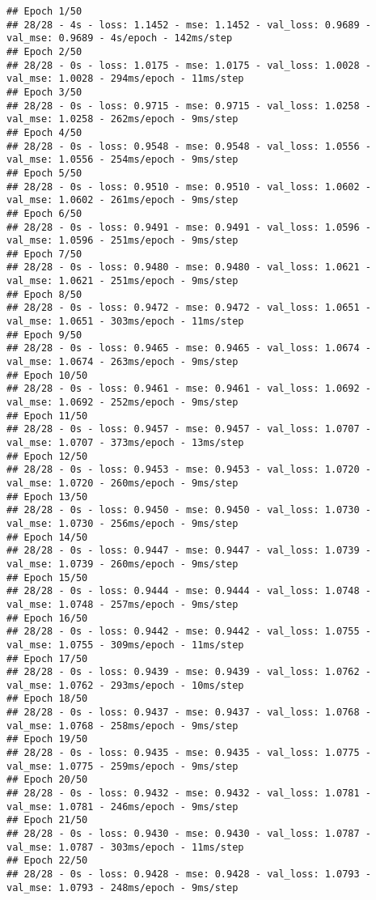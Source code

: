 \documentclass[
]{article}
\begin{document}
\begin{verbatim}
## Epoch 1/50
## 28/28 - 4s - loss: 1.1452 - mse: 1.1452 - val_loss: 0.9689 - val_mse: 0.9689 - 4s/epoch - 142ms/step
## Epoch 2/50
## 28/28 - 0s - loss: 1.0175 - mse: 1.0175 - val_loss: 1.0028 - val_mse: 1.0028 - 294ms/epoch - 11ms/step
## Epoch 3/50
## 28/28 - 0s - loss: 0.9715 - mse: 0.9715 - val_loss: 1.0258 - val_mse: 1.0258 - 262ms/epoch - 9ms/step
## Epoch 4/50
## 28/28 - 0s - loss: 0.9548 - mse: 0.9548 - val_loss: 1.0556 - val_mse: 1.0556 - 254ms/epoch - 9ms/step
## Epoch 5/50
## 28/28 - 0s - loss: 0.9510 - mse: 0.9510 - val_loss: 1.0602 - val_mse: 1.0602 - 261ms/epoch - 9ms/step
## Epoch 6/50
## 28/28 - 0s - loss: 0.9491 - mse: 0.9491 - val_loss: 1.0596 - val_mse: 1.0596 - 251ms/epoch - 9ms/step
## Epoch 7/50
## 28/28 - 0s - loss: 0.9480 - mse: 0.9480 - val_loss: 1.0621 - val_mse: 1.0621 - 251ms/epoch - 9ms/step
## Epoch 8/50
## 28/28 - 0s - loss: 0.9472 - mse: 0.9472 - val_loss: 1.0651 - val_mse: 1.0651 - 303ms/epoch - 11ms/step
## Epoch 9/50
## 28/28 - 0s - loss: 0.9465 - mse: 0.9465 - val_loss: 1.0674 - val_mse: 1.0674 - 263ms/epoch - 9ms/step
## Epoch 10/50
## 28/28 - 0s - loss: 0.9461 - mse: 0.9461 - val_loss: 1.0692 - val_mse: 1.0692 - 252ms/epoch - 9ms/step
## Epoch 11/50
## 28/28 - 0s - loss: 0.9457 - mse: 0.9457 - val_loss: 1.0707 - val_mse: 1.0707 - 373ms/epoch - 13ms/step
## Epoch 12/50
## 28/28 - 0s - loss: 0.9453 - mse: 0.9453 - val_loss: 1.0720 - val_mse: 1.0720 - 260ms/epoch - 9ms/step
## Epoch 13/50
## 28/28 - 0s - loss: 0.9450 - mse: 0.9450 - val_loss: 1.0730 - val_mse: 1.0730 - 256ms/epoch - 9ms/step
## Epoch 14/50
## 28/28 - 0s - loss: 0.9447 - mse: 0.9447 - val_loss: 1.0739 - val_mse: 1.0739 - 260ms/epoch - 9ms/step
## Epoch 15/50
## 28/28 - 0s - loss: 0.9444 - mse: 0.9444 - val_loss: 1.0748 - val_mse: 1.0748 - 257ms/epoch - 9ms/step
## Epoch 16/50
## 28/28 - 0s - loss: 0.9442 - mse: 0.9442 - val_loss: 1.0755 - val_mse: 1.0755 - 309ms/epoch - 11ms/step
## Epoch 17/50
## 28/28 - 0s - loss: 0.9439 - mse: 0.9439 - val_loss: 1.0762 - val_mse: 1.0762 - 293ms/epoch - 10ms/step
## Epoch 18/50
## 28/28 - 0s - loss: 0.9437 - mse: 0.9437 - val_loss: 1.0768 - val_mse: 1.0768 - 258ms/epoch - 9ms/step
## Epoch 19/50
## 28/28 - 0s - loss: 0.9435 - mse: 0.9435 - val_loss: 1.0775 - val_mse: 1.0775 - 259ms/epoch - 9ms/step
## Epoch 20/50
## 28/28 - 0s - loss: 0.9432 - mse: 0.9432 - val_loss: 1.0781 - val_mse: 1.0781 - 246ms/epoch - 9ms/step
## Epoch 21/50
## 28/28 - 0s - loss: 0.9430 - mse: 0.9430 - val_loss: 1.0787 - val_mse: 1.0787 - 303ms/epoch - 11ms/step
## Epoch 22/50
## 28/28 - 0s - loss: 0.9428 - mse: 0.9428 - val_loss: 1.0793 - val_mse: 1.0793 - 248ms/epoch - 9ms/step

\end{verbatim}
\end{document}
